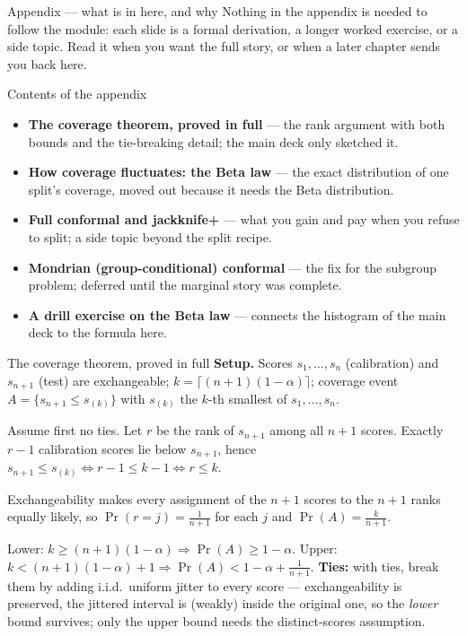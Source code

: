 \documentclass[aspectratio=169,11pt]{beamer}
\begin{document}
\begin{frame}{Appendix --- what is in here, and why}
  \small
  Nothing in the appendix is needed to follow the module: each slide is a
  formal derivation, a longer worked exercise, or a side topic. Read it when
  you want the full story, or when a later chapter sends you back here.
  \begin{block}{Contents of the appendix}
    \begin{itemize}
      \item \textbf{The coverage theorem, proved in full} --- the rank argument with
            both bounds and the tie-breaking detail; the main deck only sketched it.
      \item \textbf{How coverage fluctuates: the Beta law} --- the exact distribution
            of one split's coverage, moved out because it needs the Beta distribution.
      \item \textbf{Full conformal and jackknife+} --- what you gain and pay when you
            refuse to split; a side topic beyond the split recipe.
      \item \textbf{Mondrian (group-conditional) conformal} --- the fix for the
            subgroup problem; deferred until the marginal story was complete.
      \item \textbf{A drill exercise on the Beta law} --- connects the histogram of
            the main deck to the formula here.
    \end{itemize}
  \end{block}
\end{frame}

\begin{frame}{The coverage theorem, proved in full}
  \footnotesize
  \textbf{Setup.} Scores $s_1, \dots, s_n$ (calibration) and $s_{n+1}$ (test) are
  exchangeable; $k = \lceil (n+1)(1-\alpha) \rceil$; coverage event
  $A = \{s_{n+1} \le s_{(k)}\}$ with $s_{(k)}$ the $k$-th smallest of
  $s_1, \dots, s_n$.
  \begin{readme}
    Assume first no ties. Let $r$ be the rank of $s_{n+1}$ among all $n+1$ scores.
    Exactly $r - 1$ calibration scores lie below $s_{n+1}$, hence
    $s_{n+1} \le s_{(k)} \iff r - 1 \le k - 1 \iff r \le k$.
  \end{readme}
  \begin{readme}
    Exchangeability makes every assignment of the $n+1$ scores to the $n+1$ ranks
    equally likely, so $\Pr(r = j) = \tfrac{1}{n+1}$ for each $j$ and
    $\Pr(A) = \tfrac{k}{n+1}$.
  \end{readme}
  \begin{readme}
    Lower: $k \ge (n+1)(1-\alpha) \Rightarrow \Pr(A) \ge 1 - \alpha$.
    Upper: $k < (n+1)(1-\alpha) + 1 \Rightarrow \Pr(A) < 1 - \alpha + \tfrac{1}{n+1}$.
    \textbf{Ties:} with ties, break them by adding i.i.d.\ uniform jitter to every
    score --- exchangeability is preserved, the jittered interval is (weakly) inside
    the original one, so the \emph{lower} bound survives; only the upper bound needs
    the distinct-scores assumption.
  \end{readme}
\end{frame}
\end{document}
